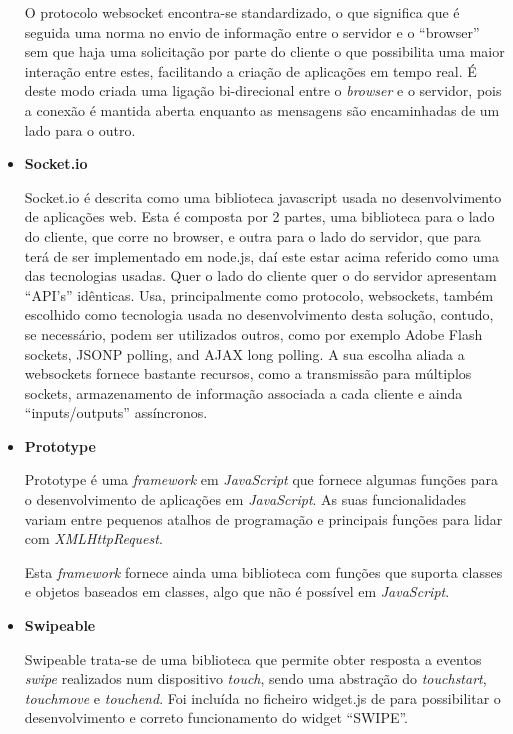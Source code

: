 \begin{itemize}
O protocolo websocket encontra-se standardizado, o que significa que é seguida uma norma no envio de informação entre o servidor e o “browser” sem que haja uma solicitação por parte do cliente o que possibilita uma maior interação entre estes, facilitando a criação de aplicações em tempo real. É deste modo criada uma ligação bi-direcional entre o \textit{browser} e o servidor, pois a conexão é mantida aberta enquanto as mensagens são encaminhadas de um lado para o outro.


\item \textbf{Socket.io}

Socket.io é descrita como uma biblioteca javascript usada no desenvolvimento de aplicações web. Esta é composta por 2 partes, uma biblioteca para o lado do cliente, que corre no browser, e outra para o lado do servidor, que para terá de ser implementado em node.js, daí este estar acima referido como uma das tecnologias usadas. Quer o lado do cliente quer o do servidor apresentam “API’s” idênticas. 
Usa, principalmente como protocolo, websockets, também escolhido como tecnologia usada no desenvolvimento desta solução, contudo, se necessário, podem ser utilizados outros, como por exemplo Adobe Flash sockets, JSONP polling, and AJAX long polling. 
A sua escolha aliada a websockets fornece bastante recursos, como a transmissão para múltiplos sockets, armazenamento de informação associada a cada cliente e ainda “inputs/outputs” assíncronos. 

\item \textbf{Prototype}

Prototype é uma \textit{framework} em \textit{JavaScript} que fornece algumas funções para o desenvolvimento de aplicações em \textit{JavaScript}. As suas funcionalidades variam entre pequenos atalhos de programação e principais funções para lidar com \textit{XMLHttpRequest}.

Esta \textit{framework} fornece ainda uma biblioteca com funções que suporta classes e objetos baseados em classes, algo que não é possível em \textit{JavaScript}.

\item \textbf{Swipeable}

Swipeable trata-se de uma biblioteca que permite obter resposta a eventos \textit{swipe} realizados num dispositivo \textit{touch}, sendo uma abstração do \textit{touchstart}, \textit{touchmove} e \textit{touchend}. 
Foi incluída no ficheiro widget.js de para possibilitar o desenvolvimento e correto funcionamento do widget “SWIPE”.

\end{itemize}


